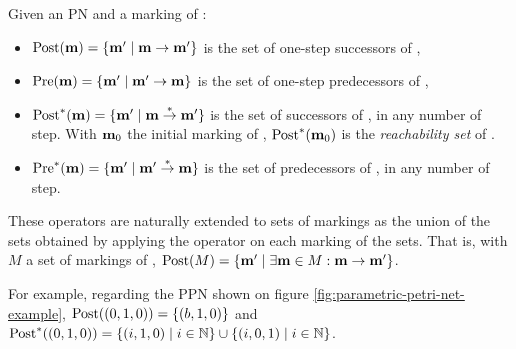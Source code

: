 \begin{defi}
  Given an \ac{PN} \NPT and a marking \marq of \tupleN:
  \begin{itemize}
    \item $\operatorname{Post}(\mathbf{m}) = \{\mathbf{m'} \mid \mathbf{m} \rightarrow \mathbf{m'}\}$ is the set of one-step successors of \marq,
    \item $\operatorname{Pre}(\mathbf{m}) = \{\mathbf{m'} \mid \mathbf{m'} \rightarrow \mathbf{m}\}$ is the set of one-step predecessors of \marq,
    \item $\operatorname{Post}^*(\mathbf{m}) = \{\mathbf{m'} \mid \mathbf{m} \stackrel{*}{\to} \mathbf{m'}\}$ is the set of successors of \marq, in any number of step.
      With $\mathbf{m}_0$ the initial marking of \tupleN, $\operatorname{Post}^*(\mathbf{m}_0)$ is the \emph{reachability set} of \tupleN.
    \item $\operatorname{Pre}^*(\mathbf{m}) = \{\mathbf{m'} \mid \mathbf{m'} \stackrel{*}{\to} \mathbf{m}\}$ is the set of predecessors of \marq, in any number of step.
  \end{itemize}
\end{defi}

These operators are naturally extended to sets of markings as the union of the sets obtained by applying the operator on each marking of the sets.
That is, with $M$ a set of markings of \NPT,
$\operatorname{Post}(M) = \{\mathbf{m'} \mid \exists \mathbf{m} \in M : \mathbf{m} \rightarrow \mathbf{m'}\}$.

For example, regarding the \ac{PPN} shown on figure \ref{fig:parametric-petri-net-example},
$\operatorname{Post}((0,1,0)) = \{(b, 1, 0)\}$
and
$\operatorname{Post}^*((0,1,0)) = \{(i, 1, 0) \mid i \in \mathbb{N}\} \cup \{(i, 0, 1) \mid i \in \mathbb{N}\}$.


